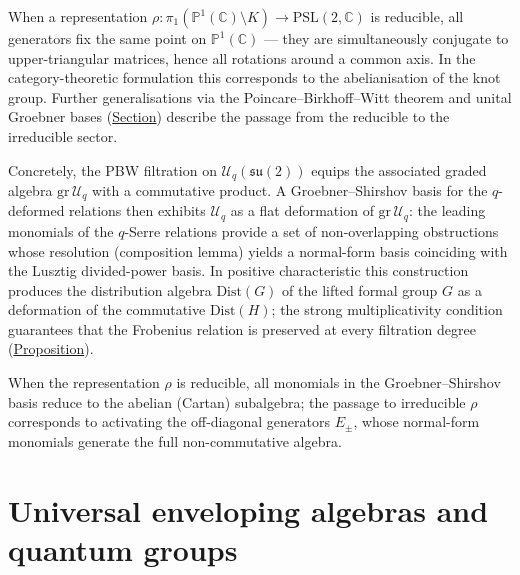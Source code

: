 \begin{remark}
  \label{rem:reducible-reps}
When a representation
$\rho\colon\pi_1(\mathbb{P}^1(\mathbb{C})\setminus K)\to\mathrm{PSL}(2,\mathbb{C})$
is reducible, all generators fix the same point on $\mathbb{P}^1(\mathbb{C})$ ---
they are simultaneously conjugate to upper-triangular matrices, hence
all rotations around a common axis.  In the category-theoretic
formulation this corresponds to the abelianisation of the knot group.
Further generalisations via the Poincare--Birkhoff--Witt theorem and
unital Groebner bases (\hyperref[sec:enveloping-algebras]{Section}) describe
the passage from the reducible to the irreducible sector.

Concretely, the PBW filtration on
$\mathcal{U}_q(\mathfrak{su}(2))$ equips the associated graded algebra
$\mathrm{gr}\,\mathcal{U}_q$ with a commutative product.  A
Groebner--Shirshov basis for the $q$-deformed relations then exhibits
$\mathcal{U}_q$ as a flat deformation of $\mathrm{gr}\,\mathcal{U}_q$:
the leading monomials of the $q$-Serre relations provide a set of
non-overlapping obstructions whose resolution (composition lemma) yields
a normal-form basis coinciding with the Lusztig divided-power
basis.  In positive characteristic this construction
produces the distribution algebra $\mathrm{Dist}(G)$ of the lifted
formal group $G$ as a deformation of the commutative
$\mathrm{Dist}(H)$; the strong multiplicativity
condition guarantees that the Frobenius relation is preserved at every
filtration degree
(\hyperref[prop:skew-poisson-integration]{Proposition}).

When the representation $\rho$ is reducible, all monomials in the
Groebner--Shirshov basis reduce to the abelian (Cartan) subalgebra; the
passage to irreducible $\rho$ corresponds to activating the
off-diagonal generators $E_\pm$, whose normal-form monomials generate
the full non-commutative algebra.
\end{remark}

\section{Universal enveloping algebras and quantum groups}
\label{sec:enveloping-algebras}




